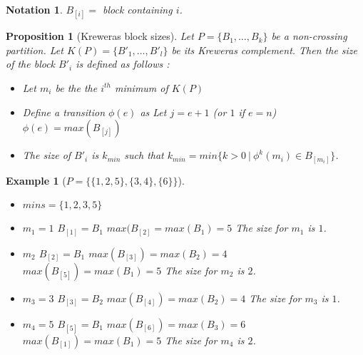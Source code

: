 \documentclass[12pt]{report}
\newtheorem*{prop}{Proposition}
\newtheorem*{example}{Example}
\newtheorem*{notation}{Notation}
\begin{document}
\begin{notation}
    $B_{[i]} = $ block containing $i$.
\end{notation}

\begin{prop}[Kreweras block sizes]
    Let $P = \{B_1, \ldots, B_k\}$ be a non-crossing partition.
    Let $K (P) = \{B'_1, \ldots, B'_l\}$ be its Kreweras complement.
    Then the size of the block $B'_i$ is defined as follows :
    \begin{itemize}
        \item Let $m_i$ be the the $i^{th}$ minimum of $K (P)$
        \item Define a \emph{transition} $\phi (e)$ as 
            \subitem Let $j = e + 1$ (or $1$ if $e = n$)
            \subitem $\phi(e) = max (B_{[j]})$
        \item The size of $B'_i$ is $k_{min}$ such that
        $k_{min} = min \{k > 0\ |\ \phi^k (m_i) \in B_{[m_i]}\}$.\\
    \end{itemize}
\end{prop}

\begin{example}[$P = \{\{1, 2, 5\}, \{3, 4\}, \{6\}\}$]
    ~\\
    \begin{itemize}
        \item $mins = \{1, 2, 3, 5\}$
        \item $m_1 = 1$
            \subitem $B_{[1]} = B_1$
            \subitem $max (B_{[2]} = max (B_1) = 5$
            \subitem The size for $m_1$ is $1$.
        \item $m_2$
            \subitem $B_{[2]} = B_1$
            \subitem $max (B_{[3]}) = max (B_2) = 4$
            \subitem $max (B_{[5]}) = max (B_1) = 5$
            \subitem The size for $m_2$ is $2$.
        \item $m_3 = 3$
            \subitem $B_{[3]} = B_2$
            \subitem $max (B_{[4]}) = max (B_2) = 4$
            \subitem The size for $m_3$ is $1$.
        \item $m_4 = 5$
            \subitem $B_{[5]} = B_1$
            \subitem $max (B_{[6]}) = max (B_3) = 6$
            \subitem $max (B_{[1]}) = max (B_1) = 5$
            \subitem The size for $m_4$ is $2$.
    \end{itemize}
\end{example}
\end{document}
